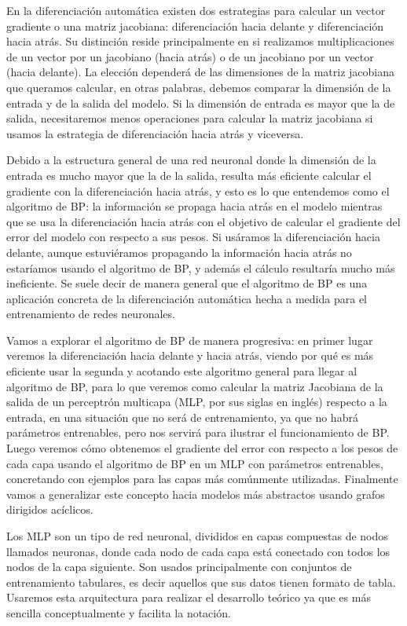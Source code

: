 En la diferenciación automática existen dos estrategias para calcular un vector gradiente o una matriz jacobiana: diferenciación hacia delante y diferenciación hacia atrás. Su distinción reside  principalmente en si realizamos multiplicaciones de un vector por un jacobiano (hacia atrás) o de un jacobiano por un vector (hacia delante). La elección dependerá de las dimensiones de la matriz jacobiana que queramos calcular, en otras palabras, debemos comparar la dimensión de la entrada y de la salida del modelo. Si la dimensión de entrada es mayor que la de salida, necesitaremos menos operaciones para calcular la matriz jacobiana si usamos la estrategia de diferenciación hacia atrás y viceversa. 

Debido a la estructura general de una red neuronal donde la dimensión de la entrada es mucho mayor que la de la salida, resulta más eficiente calcular el gradiente con la diferenciación hacia atrás, y esto es lo que entendemos como el algoritmo de BP: la información se propaga hacia atrás en el modelo mientras que se usa la diferenciación hacia atrás con el objetivo de calcular el gradiente del error del modelo con respecto a sus pesos. Si usáramos la diferenciación hacia delante, aunque estuviéramos propagando la información hacia atrás no estaríamos usando el algoritmo de BP, y además el cálculo resultaría mucho más ineficiente. Se suele decir de manera general que el algoritmo de BP es una aplicación concreta de la diferenciación automática hecha a medida para el entrenamiento de redes neuronales.


Vamos a explorar el algoritmo de BP de manera progresiva: en primer lugar veremos la diferenciación hacia delante y hacia atrás, viendo por qué es más eficiente usar la segunda y acotando este algoritmo general para llegar al algoritmo de BP, para lo que veremos como calcular la matriz Jacobiana de la salida de un perceptrón multicapa (MLP, por sus siglas en inglés) respecto a la entrada, en una situación que no será de entrenamiento, ya que no habrá parámetros entrenables, pero nos servirá para ilustrar el funcionamiento de BP. Luego veremos cómo obtenemos el gradiente del error con respecto a los pesos de cada capa usando el algoritmo de BP en un MLP con parámetros entrenables, concretando con ejemplos para las capas más comúnmente utilizadas. Finalmente vamos a generalizar este concepto hacia modelos más abstractos usando grafos dirigidos acíclicos. 


Los MLP son un tipo de red neuronal, divididos en capas compuestas de nodos llamados neuronas, donde cada nodo de cada capa está conectado con todos los nodos de la capa siguiente. Son usados principalmente con conjuntos de entrenamiento tabulares, es decir aquellos que sus datos tienen formato de tabla. Usaremos esta arquitectura para realizar el desarrollo teórico ya que es más sencilla conceptualmente y facilita la notación. 

